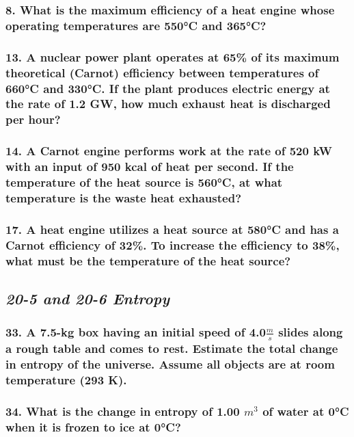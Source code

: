 \documentclass{article}
\begin{document}
\subsubsection*{
    8. What is the maximum efficiency of a heat engine whose
    operating temperatures are 550°C and 365°C?
}
\vspace{3.5in}
\subsubsection*{
    13. A nuclear power plant operates at 65\% of its maximum
    theoretical (Carnot) efficiency between temperatures of 660°C
    and 330°C. If the plant produces electric energy at the rate of
    1.2 GW, how much exhaust heat is discharged per hour?
}
\newpage
\subsubsection*{
    14. A Carnot engine performs work at the rate of 520 kW
    with an input of 950 kcal of heat per second. If the
    temperature of the heat source is 560°C, at what temperature
    is the waste heat exhausted?
}
\vspace{3.5in}
\subsubsection*{
    17. A heat engine utilizes a heat source at 580°C and has a
    Carnot efficiency of 32\%. To increase the efficiency to 38\%,
    what must be the temperature of the heat source?
}
\newpage
\begin{center}
    \subsection*{\textbf{\textit{20-5 and 20-6 Entropy}}}
\end{center}
\subsubsection*{
    33. A 7.5-kg box having an initial speed of 4.0$\frac m s$ slides
    along a rough table and comes to rest. Estimate the total
    change in entropy of the universe. Assume all objects are at
    room temperature (293 K).
}
\vspace{3.5in}
\subsubsection*{
    34. What is the change in entropy of 1.00 $m^3$ of water at 0°C
    when it is frozen to ice at 0°C?
}
\newpage
\end{document}
